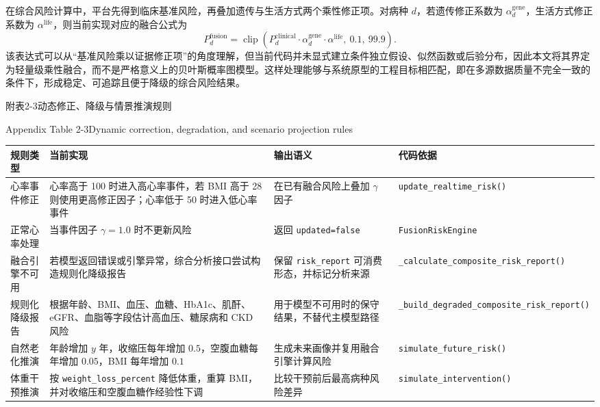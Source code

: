 \documentclass[UTF8, a4paper, 12pt, oneside]{ctexrep}
\numberwithin{equation}{chapter}
\newcommand{\codeid}[1]{{\begingroup\urlstyle{rm}\nolinkurl{#1}\endgroup}}
\begin{document}
{\vspace{\baselineskip}
在综合风险计算中，平台先得到临床基准风险，再叠加遗传与生活方式两个乘性修正项。对病种 \(d\)，若遗传修正系数为 \(\alpha_d^{\mathrm{gene}}\)，生活方式修正系数为 \(\alpha^{\mathrm{life}}\)，则当前实现对应的融合公式为
\begin{equation*}
P_d^{\mathrm{fusion}} =
\operatorname{clip}\!\left(
P_d^{\mathrm{clinical}}
\cdot \alpha_d^{\mathrm{gene}}
\cdot \alpha^{\mathrm{life}},\ 0.1,\ 99.9
\right).
\tag{附2-2}
\end{equation*}
该表达式可以从“基准风险乘以证据修正项”的角度理解，但当前代码并未显式建立条件独立假设、似然函数或后验分布，因此本文将其界定为轻量级乘性融合，而不是严格意义上的贝叶斯概率图模型。这样处理能够与系统原型的工程目标相匹配，即在多源数据质量不完全一致的条件下，形成稳定、可追踪且便于降级的综合风险结果。

\vspace{0.5\baselineskip}
\begin{center}
{\songti{}附表2-3\quad 动态修正、降级与情景推演规则\par}
{\rmfamily{}Appendix Table 2-3\quad Dynamic correction, degradation, and scenario projection rules\par}
\end{center}
\vspace{-0.5\baselineskip}
{\songti{}
\noindent\begin{tabular}{@{}>{\raggedright\arraybackslash}p{} >{\raggedright\arraybackslash}p{} >{\raggedright\arraybackslash}p{} >{\raggedright\arraybackslash}p{}@{}}
\toprule
规则类型 & 当前实现 & 输出语义 & 代码依据 \\
\midrule
心率事件修正 & 心率高于 100 时进入高心率事件，若 BMI 高于 28 则使用更高修正因子；心率低于 50 时进入低心率事件 & 在已有融合风险上叠加 \(\gamma\) 因子 & \codeid{update_realtime_risk()} \\
正常心率处理 & 当事件因子 \(\gamma=1.0\) 时不更新风险 & 返回 \codeid{updated=false} & \codeid{FusionRiskEngine} \\
融合引擎不可用 & 若模型返回错误或引擎异常，综合分析接口尝试构造规则化降级报告 & 保留 \codeid{risk_report} 可消费形态，并标记分析来源 & \codeid{_calculate_composite_risk_report()} \\
规则化降级报告 & 根据年龄、BMI、血压、血糖、HbA1c、肌酐、eGFR、血脂等字段估计高血压、糖尿病和 CKD 风险 & 用于模型不可用时的保守结果，不替代主模型路径 & \codeid{_build_degraded_composite_risk_report()} \\
自然老化推演 & 年龄增加 \(y\) 年，收缩压每年增加 \(0.5\)，空腹血糖每年增加 \(0.05\)，BMI 每年增加 \(0.1\) & 生成未来画像并复用融合引擎计算风险 & \codeid{simulate_future_risk()} \\
体重干预推演 & 按 \codeid{weight_loss_percent} 降低体重，重算 BMI，并对收缩压和空腹血糖作经验性下调 & 比较干预前后最高病种风险差异 & \codeid{simulate_intervention()} \\
\bottomrule
\end{tabular}
}

}
\end{document}
